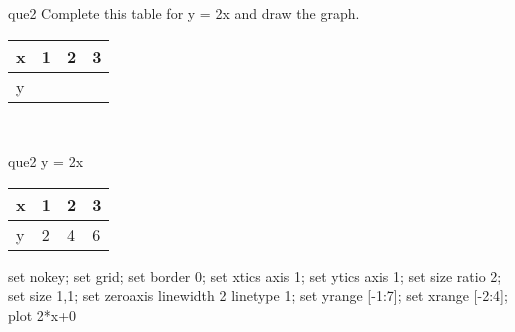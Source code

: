 \documentclass[13.5pt, varwidth=true]{beamer}
\begin{document}
\begin{frame}[shrink=19,fragile]
	\begin{beamercolorbox}[rounded=true, left, shadow=true,wd=14.8cm]{que2}
		 Complete this table for y = 2x and draw the graph. \\[0.3cm] \renewcommand{\arraystretch}{1.2}\begin{tabular}{|C|C|C|C|} \hline x & 1 & 2 & 3 \\ \hline y & & & \\ \hline \end{tabular}\\[0.3cm]
	\end{beamercolorbox}
\end{frame}
\begin{frame}[shrink=19,fragile]
	\begin{beamercolorbox}[rounded=true, left, shadow=true,wd=14.8cm]{que2}
 		y = 2x\renewcommand{\arraystretch}{1.2}\begin{tabular}{|C|C|C|C|} \hline x & 1 & 2 & 3 \\ \hline y & 2 & 4 & 6\\ \hline \end{tabular}\begin{gnuplot}[terminal=pdf] set nokey; set grid; set border 0; set xtics axis 1; set ytics axis 1; set size ratio 2; set size 1,1; set zeroaxis linewidth 2 linetype 1; set yrange [-1:7]; set xrange [-2:4]; plot 2*x+0 \end{gnuplot}
	\end{beamercolorbox}
\end{frame}
\end{document}
